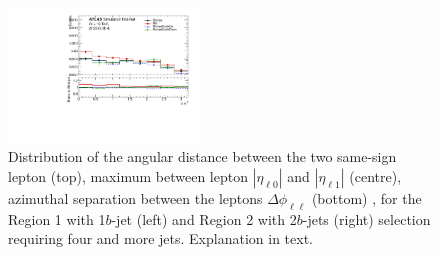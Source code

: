\begin{figure}[!htb]
\includegraphics[width=0.45\textwidth]{Plots/ttV/c_Region_1_lep_dPhi} 
  \caption{Distribution of the angular distance between the two same-sign lepton (top), maximum between lepton $|\eta_{\ell 0}|$ and $|\eta_{\ell 1}|$ (centre), azimuthal separation between the leptons $\Delta \phi _{\ell \ell }$ (bottom) , for the Region 1 with 1$b$-jet (left) and Region 2 with 2$b$-jets (right) selection requiring four and more jets. Explanation in text.
   \label{ttV:ll_kin}}
\end{figure}
% 




